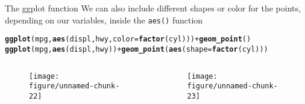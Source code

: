 \documentclass{beamer}\usepackage[]{graphicx}\usepackage[]{color}
\makeatletter
\def\maxwidth{ %
  \ifdim\Gin@nat@width>\linewidth
    \linewidth
  \else
    \Gin@nat@width
  \fi
}
\newcommand{\hlopt}[1]{\textcolor[rgb]{0,0,0}{#1}}%
\newcommand{\hlstd}[1]{\textcolor[rgb]{0.345,0.345,0.345}{#1}}%
\newcommand{\hlkwc}[1]{\textcolor[rgb]{0.333,0.667,0.333}{#1}}%
\newcommand{\hlkwd}[1]{\textcolor[rgb]{0.737,0.353,0.396}{\textbf{#1}}}%
\newenvironment{kframe}{%
 \def\at@end@of@kframe{}%
 \ifinner\ifhmode%
  \def\at@end@of@kframe{\end{minipage}}%
  \begin{minipage}{\columnwidth}%
 \fi\fi%
 \def\FrameCommand##1{\hskip\@totalleftmargin \hskip-\fboxsep
 \colorbox{shadecolor}{##1}\hskip-\fboxsep
     \hskip-\linewidth \hskip-\@totalleftmargin \hskip\columnwidth}%
 \MakeFramed {\advance\hsize-\width
   \@totalleftmargin\z@ \linewidth\hsize
   \@setminipage}}%
 {\par\unskip\endMakeFramed%
 \at@end@of@kframe}
\newenvironment{knitrout}{}{} %
\makeatother
\begin{document}
\begin{frame}[containsverbatim]{The ggplot function}
We can also include different shapes or color for the points, depending on our variables, inside the \texttt{aes()} function 
\begin{small}
\begin{knitrout}\footnotesize
{}\color{fgcolor}\begin{kframe}
\begin{alltt}
\hlkwd{ggplot}\hlstd{(mpg,} \hlkwd{aes}\hlstd{(displ, hwy,} \hlkwc{color}\hlstd{=}\hlkwd{factor}\hlstd{(cyl)))}\hlopt{+} \hlkwd{geom_point}\hlstd{()}
\hlkwd{ggplot}\hlstd{(mpg,} \hlkwd{aes}\hlstd{(displ, hwy))}\hlopt{+} \hlkwd{geom_point}\hlstd{(}\hlkwd{aes}\hlstd{(}\hlkwc{shape}\hlstd{=}\hlkwd{factor}\hlstd{(cyl)))}
\end{alltt}
\end{kframe}
\end{knitrout}
\end{small}
\begin{columns}[t] 
\begin{framed}
 \begin{minipage}{0.8\textwidth}
\begin{figure}[!t]
\centering
\begin{knitrout}\footnotesize
{}\color{fgcolor}
\texttt{[image: figure/unnamed-chunk-22]} 

\end{knitrout}
\end{figure}
 \end{minipage}
 \end{framed}

\begin{framed}
 \begin{minipage}{0.8\textwidth}
\begin{figure}[!t]
\centering
\begin{knitrout}\footnotesize
{}\color{fgcolor}
\texttt{[image: figure/unnamed-chunk-23]} 

\end{knitrout}
\end{figure}
 \end{minipage}
 \end{framed}
\end{columns}
\end{frame}
\end{document}

